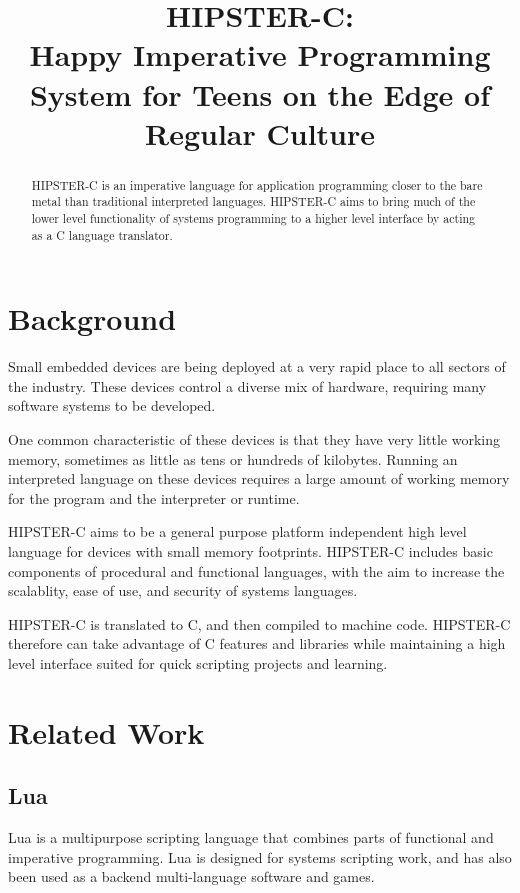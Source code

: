 \documentclass{article}
\title{HIPSTER-C:\\
       Happy Imperative Programming System for Teens on the Edge of Regular Culture}
\begin{document}
\maketitle


\begin{abstract}
  HIPSTER-C is an imperative language for application programming closer to the bare metal than traditional interpreted languages. HIPSTER-C aims to bring much of the lower level functionality of systems programming to a higher level interface by acting as a C language translator.
\end{abstract} 



\section{Background}
Small embedded devices are being deployed at a very rapid place to all sectors of the industry. These devices control a diverse mix of hardware, requiring many software systems to be developed. \par
One common characteristic of these devices is that they have very little working memory, sometimes as little as tens or hundreds of kilobytes. Running an interpreted language on these devices requires a large amount of working memory for the program and the interpreter or runtime. \par
HIPSTER-C aims to be a general purpose platform independent high level language for devices with small memory footprints. HIPSTER-C includes basic components of procedural and functional languages, with the aim to increase the scalablity, ease of use, and security of systems languages. \par 
HIPSTER-C is translated to C, and then compiled to machine code. HIPSTER-C therefore can take advantage of C features and libraries while maintaining a high level interface suited for quick scripting projects and learning. 

\section{Related Work}
\subsection{Lua}
Lua is a multipurpose scripting language that combines parts of functional and imperative programming. Lua is designed for systems scripting work, and has also been used as a backend multi-language software and games. 
\end{document}
